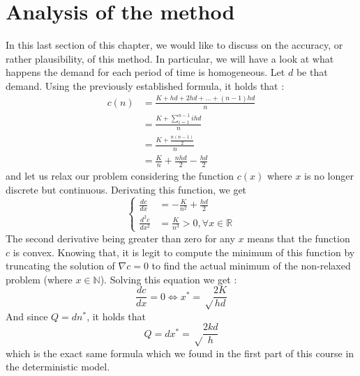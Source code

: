 \section{Analysis of the method}

In this last section of this chapter, we would like to discuss on the accuracy, or rather plausibility, of this method. In particular, we will have a look at what happens the demand for each period of time is homogeneous. Let $d$ be that demand. Using the previously established formula, it holds that :
\[
    \begin{split}
        c(n) &= \frac{K+hd+2hd+\hdots+(n-1)hd}{n}\\
            &= \frac{K+\sum_{i=1}^{n-1}ihd}{n}\\
            &= \frac{K+\frac{n(n-1)}{2}}{n}\\
            &= \frac{K}{n} + \frac{nhd}{2} - \frac{hd}{2}
    \end{split}
\]
and let us relax our problem considering the function $c(x)$ where $x$ is no longer discrete but continuous. Derivating this function, we get 
\[
    \begin{cases}
        \frac{dc}{dx} &= -\frac{K}{n^2} + \frac{hd}{2}\\
        \frac{d^2c}{dx^2} &= \frac{K}{n^3} > 0, \forall x\in\mathbb R
    \end{cases}
\]
The second derivative being greater than zero for any $x$ means that the function $c$ is convex. Knowing that, it is legit to compute the minimum of this function by truncating the solution of $\nabla c = 0$ to find the actual minimum of the non-relaxed problem (where $x\in\mathbb N$). Solving this equation we get : \[ \frac{dc}{dx} = 0 \Leftrightarrow x^* = \sqrt\frac{2K}{hd} \]
And since $Q = dn^*$, it holds that \[ Q = dx^* = \sqrt\frac{2kd}h  \] which is the exact same formula which we found in the first part of this course in the deterministic model. 